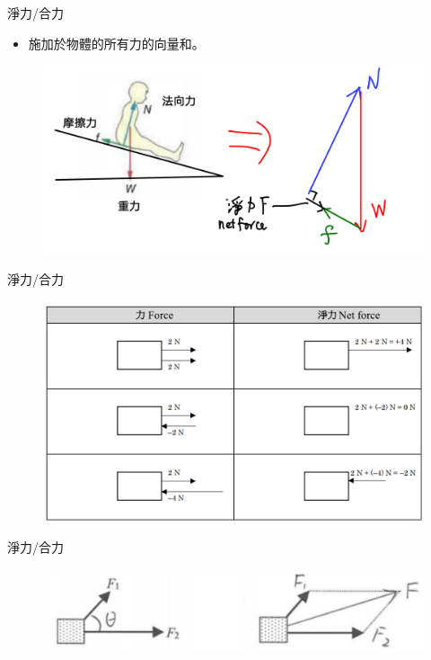 \documentclass[beamer=true]{standalone}
\begin{document}
\begin{frame}{淨力/合力}
    \begin{itemize}
        \item 施加於物體的所有力的向量和。
    \end{itemize}\bigskip
    \begin{figure}[h!]
        \centering
        \includegraphics[width=.8\textwidth]{assets/96369bc9.png}
    \end{figure}
\end{frame}
\begin{frame}{淨力/合力}
    \begin{figure}[h!]
        \centering
        \includegraphics[width=\textwidth]{assets/5ffd7887.png}
    \end{figure}
\end{frame}
\begin{frame}{淨力/合力}
    \begin{figure}[h!]
        \centering
        \includegraphics[width=.8\textwidth]{assets/61448695.png}
    \end{figure}
\end{frame}
\end{document}
